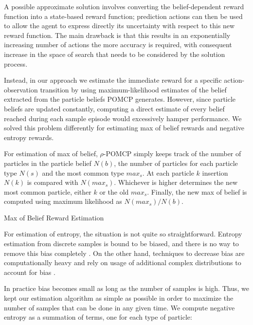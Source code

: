 A possible approximate solution involves converting the belief-dependent reward function into a
state-based reward function; prediction actions can then be used to allow the agent to express
directly its uncertainty with respect to this new reward function. The main drawback is that this
results in an exponentially increasing number of actions the more accuracy is required, with
consequent increase in the space of search that needs to be considered by the solution process.

Instead, in our approach we estimate the immediate reward for a specific action-observation
transition by using maximum-likelihood estimates of the belief extracted from the particle beliefs
POMCP generates. However, since particle beliefs are updated constantly, computing a direct estimate
of every belief reached during each sample episode would excessively hamper performance. We solved
this problem differently for estimating max of belief rewards and negative entropy rewards.

For estimation of max of belief, $\rho$-POMCP simply keeps track of the number of particles in the
particle belief $N(b)$, the number of particles for each particle type $N(s)$ and the most common
type $max_s$. At each particle $k$ insertion $N(k)$ is compared with $N(max_s)$. Whichever is higher
determines the new most common particle, either $k$ or the old $max_s$. Finally, the new max of
belief is computed using maximum likelihood as $N(max_s)/N(b)$.

\begin{algorithm}[H]
    \caption{Max of Belief Reward Estimation}

\end{algorithm}

For estimation of entropy, the situation is not quite so straightforward. Entropy estimation from
discrete samples is bound to be biased, and there is no way to remove this bias completely
\cite{cit:badentropy}. On the other hand, techniques to decrease bias are computationally heavy and
rely on usage of additional complex distributions to account for bias \cite{cit:entropyfixes}.

In practice bias becomes small as long as the number of samples is high. Thus, we kept our
estimation algorithm as simple as possible in order to maximize the number of samples that can be
done in any given time. We compute negative entropy as a summation of terms, one for each type of
particle:

